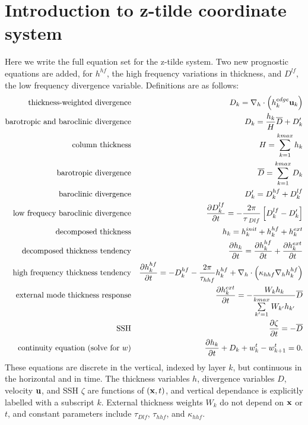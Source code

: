 \documentclass[11pt]{report}
\newcommand{\bea}{\begin{eqnarray}}
\newcommand{\eea}{\end{eqnarray}}
\begin{document}
\section{Introduction to z-tilde coordinate system}

Here we write the full equation set for the z-tilde system.
Two new prognostic equations are added, for $h^{hf}$, the high frequency variations in thickness, and $D^{lf}$, the low frequency divergence variable.  Definitions are as follows: 
\bea
\mbox{thickness-weighted divergence} && D_k = \nabla_h \cdot  \left( h^{edge}_k {\bf u}_k \right)  \label{D1} \\
\mbox{barotropic and baroclinic divergence} && 
D_k = \frac{h_k}{H}{\overline D} + D_k' \label{D}\\
\mbox{column thickness} && H=\sum\limits_{k=1}^{kmax} h_{k} \label{H}\\
\mbox{barotropic divergence} && {\overline D} = \sum\limits_{k=1}^{kmax} D_k  \label{Dbtr}\\
\mbox{baroclinic divergence} &&  D_k'= D^{hf}_k + D^{lf}_k \label{Dbcl}\\
\mbox{low frequecy baroclinic divergence} && 
  \frac{\partial D^{lf}_k}{\partial t} = - \frac{2\pi}{\tau_{\;Dlf}} \left[ D^{lf}_k - D'_k \right] \label{Dlf}\\
\mbox{decomposed thickness} && h_k = h^{init}_k + h^{hf}_k + h^{ext}_k \label{h} \\
\mbox{decomposed thickness tendency} && 
  \frac{\partial h_k}{\partial t} = \frac{\partial h^{hf}_k}{\partial t} + \frac{\partial h^{ext}_k}{\partial t} 
   \label{dhdt} \\
\mbox{high frequency thickness tendency} && 
\label{hhf}
  \frac{\partial h^{hf}_k}{\partial t} = 
   - D^{hf}_k - \frac{2\pi}{\tau_{hhf}} h_k^{hf}
   + \nabla_h\cdot \left( \kappa_{hhf} \nabla_h h_k^{hf} \right)
   \label{preliminary_thickness} \\
\mbox{external mode thickness response} && 
  \frac{\partial h^{ext}_k}{\partial t} = - \frac{W_k h_k}{\sum\limits_{k'=1}^{kmax} W_{k'} h_{k'}}
  {\overline D} 
   \label{hext} \\
\mbox{SSH} && 
  \frac{\partial \zeta}{\partial t}  = -{\overline D}
   \label{ssh} \\
\mbox{continuity equation (solve for $w$)} && 
\label{cont} 
\frac{\partial h_{k}}{\partial t} + D_k + w^t_k - w^t_{k+1} =0.
\eea
These equations are discrete in the vertical, indexed by layer $k$, but continuous in the horizontal and in time.  The thickness variables $h$, divergence variables $D$, velocity ${\bf u}$,  and SSH $\zeta$ are functions of $({\bf x},t)$, and vertical dependance is explicitly labelled with a subscript $k$.  External thickness weights $W_k$ do not depend on ${\bf x}$ or $t$, and constant parameters include 
$\tau_{Dlf}$, $\tau_{hhf}$, and $\kappa_{hhf}$.
\end{document}
